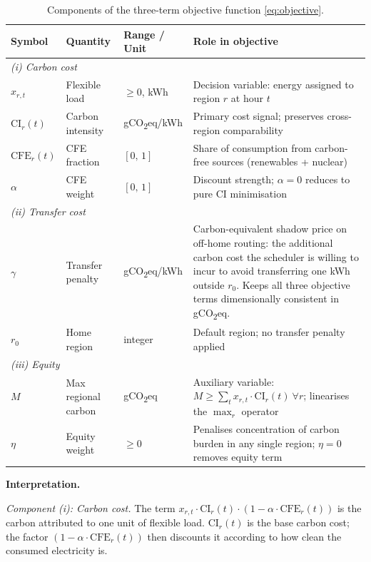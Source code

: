 \documentclass[11pt, a4paper]{article}
\begin{document}
\begin{table}[h]
\centering\small
\renewcommand{\arraystretch}{1.3}
\begin{tabularx}{\linewidth}{llp{2.8cm}X}
\toprule
\textbf{Symbol} & \textbf{Quantity} & \textbf{Range / Unit} & \textbf{Role in objective} \\
\midrule
\multicolumn{4}{l}{\textit{(i) Carbon cost}} \\
$x_{r,t}$ & Flexible load & $\geq 0$, kWh & Decision variable: energy assigned to region $r$ at hour $t$ \\
$\text{CI}_r(t)$ & Carbon intensity & gCO\textsubscript{2}eq/kWh & Primary cost signal; preserves cross-region comparability \\
$\text{CFE}_r(t)$ & CFE fraction & $[0,\,1]$ & Share of consumption from carbon-free sources (renewables + nuclear) \\
$\alpha$ & CFE weight & $[0,\,1]$ & Discount strength; $\alpha{=}0$ reduces to pure CI minimisation \\
\midrule
\multicolumn{4}{l}{\textit{(ii) Transfer cost}} \\
$\gamma$ & Transfer penalty & gCO\textsubscript{2}eq/kWh & Carbon-equivalent shadow price on off-home routing: the additional carbon cost the scheduler is willing to incur to avoid transferring one kWh outside $r_0$. Keeps all three objective terms dimensionally consistent in gCO\textsubscript{2}eq. \\
$r_0$ & Home region & integer & Default region; no transfer penalty applied \\
\midrule
\multicolumn{4}{l}{\textit{(iii) Equity}} \\
$M$ & Max regional carbon & gCO\textsubscript{2}eq & Auxiliary variable: $M \geq \sum_t x_{r,t}\cdot\text{CI}_r(t)\ \forall r$; linearises the $\max_r$ operator \\
$\eta$ & Equity weight & $\geq 0$ & Penalises concentration of carbon burden in any single region; $\eta{=}0$ removes equity term \\
\bottomrule
\end{tabularx}
\caption{Components of the three-term objective function \eqref{eq:objective}.}
\end{table}

\textbf{Interpretation.}

\textit{Component (i): Carbon cost.}
The term $x_{r,t} \cdot \text{CI}_r(t) \cdot (1 - \alpha \cdot \text{CFE}_r(t))$ is the carbon attributed to one unit of flexible load. $\text{CI}_r(t)$ is the base carbon cost; the factor $(1 - \alpha \cdot \text{CFE}_r(t))$ then discounts it according to how clean the consumed electricity is.
\end{document}
